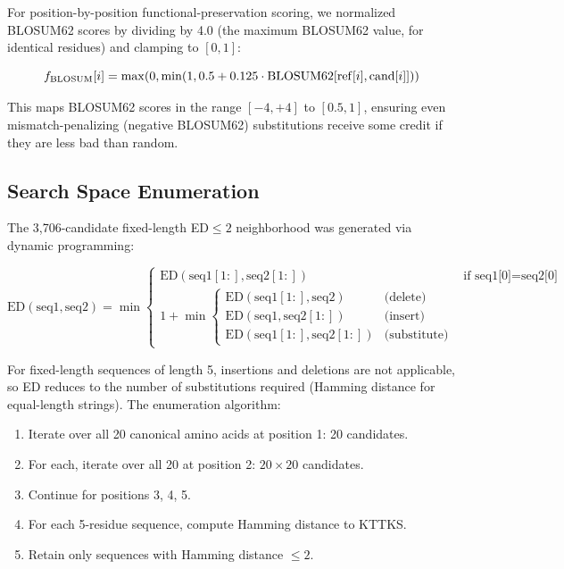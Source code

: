 \documentclass[11pt,letterpaper]{article}
\begin{document}
For position-by-position functional-preservation scoring, we normalized BLOSUM62 scores by dividing by 4.0 (the maximum BLOSUM62 value, for identical residues) and clamping to $[0, 1]$:

\begin{equation}
f_{\text{BLOSUM}}[i] = \max(0, \min(1, 0.5 + 0.125 \cdot \text{BLOSUM62}[{\rm ref}[i], {\rm cand}[i]]))
\label{eq:blosum_norm}
\end{equation}

This maps BLOSUM62 scores in the range $[-4, +4]$ to $[0.5, 1]$, ensuring even mismatch-penalizing (negative BLOSUM62) substitutions receive some credit if they are less bad than random.

\subsection{Search Space Enumeration}

The 3,706-candidate fixed-length ED$\leq 2$ neighborhood was generated via dynamic programming:

\begin{equation}
\text{ED}(\text{seq1}, \text{seq2}) = \min \begin{cases}
\text{ED}(\text{seq1}[1:], \text{seq2}[1:]) & \text{if seq1[0]} = \text{seq2[0]} \\
1 + \min \begin{cases}
\text{ED}(\text{seq1}[1:], \text{seq2}) & \text{(delete)} \\
\text{ED}(\text{seq1}, \text{seq2}[1:]) & \text{(insert)} \\
\text{ED}(\text{seq1}[1:], \text{seq2}[1:]) & \text{(substitute)}
\end{cases}
\end{cases}
\label{eq:edit_distance}
\end{equation}

For fixed-length sequences of length 5, insertions and deletions are not applicable, so ED reduces to the number of substitutions required (Hamming distance for equal-length strings). The enumeration algorithm:

\begin{enumerate}
  \item Iterate over all 20 canonical amino acids at position 1: 20 candidates.
  \item For each, iterate over all 20 at position 2: $20 \times 20$ candidates.
  \item Continue for positions 3, 4, 5.
  \item For each 5-residue sequence, compute Hamming distance to KTTKS.
  \item Retain only sequences with Hamming distance $\leq 2$.
\end{enumerate}
\end{document}
